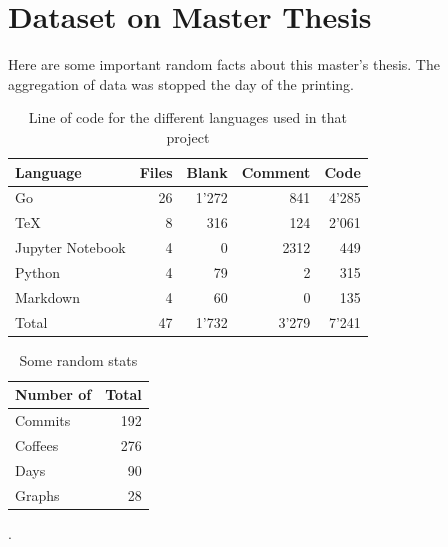 \documentclass[a4paper,11pt,twoside=semi,openright]{report}
\begin{document}
\chapter{Dataset on Master Thesis}
Here are some important random facts about this master's thesis. The
aggregation of data was stopped the day of the printing. 
\begin{table}[h]
\centering
\begin{tabular}{@{}lrrrr@{}}
\toprule
\textbf{Language}   &\textbf{Files} & \textbf{Blank} & \textbf{Comment} & \textbf{Code} \\ \midrule
Go    & 26 & 1'272 & 841  & 4'285 \\ \hdashline
TeX    & 8  & 316 & 124  & 2'061 \\ \hdashline
Jupyter Notebook & 4  & 0  & 2312  & 449 \\ \hdashline
Python   & 4  & 79 & 2  & 315 \\ \hdashline
Markdown   & 4  & 60 & 0  & 135 \\ \midrule
Total   & 47 & 1'732 & 3'279 & 7'241 \\
\midrule
\bottomrule
\end{tabular}
\caption{Line of code for the different languages used in that project}
\label{tab:my-table}
\end{table}

\begin{table}[h]
\centering
\begin{tabular}{@{}lr@{}}
\toprule
\textbf{Number of}    & \textbf{Total} \\ \midrule
 Commits & 192 \\ \hdashline
 Coffees & 276 \\ \hdashline
Days & 90 \\ \hdashline
Graphs & 28 \\
\midrule
\bottomrule
\end{tabular}
\caption{Some random stats}.
\label{tab:my-table}
\end{table}
\end{document}
